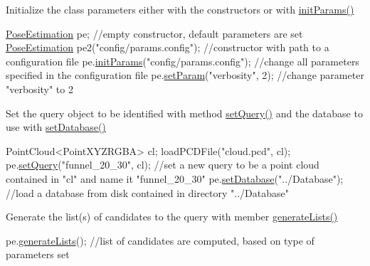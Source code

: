 \begin{DoxyItemize}
\item Initialize the class parameters either with the constructors or with \hyperlink{classPoseEstimation_a8359f6ffae7fc0cf99692d926dd1e7c4}{init\-Params()} 
\begin{DoxyCode}
\hyperlink{classPoseEstimation}{PoseEstimation} pe; \textcolor{comment}{//empty constructor, default parameters are set}
\hyperlink{classPoseEstimation}{PoseEstimation} pe2(\textcolor{stringliteral}{"config/params.config"}); \textcolor{comment}{//constructor with path to a configuration file}
pe.\hyperlink{classPoseEstimation_a8359f6ffae7fc0cf99692d926dd1e7c4}{initParams}(\textcolor{stringliteral}{"config/params.config"}); \textcolor{comment}{//change all parameters specified in the configuration
       file}
pe.\hyperlink{classPoseEstimation_ae416bbbfdefdb60a6f82a9b255edc124}{setParam}(\textcolor{stringliteral}{"verbosity"}, 2); \textcolor{comment}{//change parameter "verbosity" to 2}
\end{DoxyCode}

\item Set the query object to be identified with method \hyperlink{classPoseEstimation_a8c3e730167d42d2d8cfd4a08389d17ce}{set\-Query()} and the database to use with \hyperlink{classPoseEstimation_a0ace84f98f2bab31e64ffaa4eefdf402}{set\-Database()} 
\begin{DoxyCode}
PointCloud<PointXYZRGBA> cl;
loadPCDFile(\textcolor{stringliteral}{"cloud.pcd"}, cl);
pe.\hyperlink{classPoseEstimation_a8c3e730167d42d2d8cfd4a08389d17ce}{setQuery}(\textcolor{stringliteral}{"funnel\_20\_30"}, cl); \textcolor{comment}{//set a new query to be a point cloud contained in "cl" and name
       it "funnel\_20\_30"}
pe.\hyperlink{classPoseEstimation_a0ace84f98f2bab31e64ffaa4eefdf402}{setDatabase}(\textcolor{stringliteral}{"../Database"}); \textcolor{comment}{//load a database from disk contained in directory "../Database"}
\end{DoxyCode}

\item Generate the list(s) of candidates to the query with member \hyperlink{classPoseEstimation_aa240b7ff2e362aa091f531ebd34359ad}{generate\-Lists()} 
\begin{DoxyCode}
pe.\hyperlink{classPoseEstimation_a7f16094de53753e91efa3d4728a928be}{generateLists}(); \textcolor{comment}{//list of candidates are computed, based on type of parameters set}
\end{DoxyCode}


\end{DoxyItemize}
